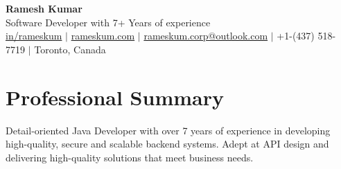 \documentclass[a4paper, 10pt]{article}
\begin{document}
\begin{center}
  \textbf{\huge Ramesh Kumar} \\
  \vspace{2pt}
  Software Developer with 7+ Years of experience\\
  \vspace{2pt}
  \href{https:\\linkedin.com/in/rameskum}{\small \faLinkedin \hspace{2pt} in/rameskum}
  $\vert$
  \href{https:\\rameskum.com}{\small \faChain \hspace{1pt} rameskum.com}
  $\vert$
  \href{mailto:rameskum.corp@outlook.com}{\small \faEnvelope \hspace{2pt} rameskum.corp@outlook.com}
  $\vert$
  \faPhone \hspace{1pt} \small{ +1-(437) 518-7719}
  $\vert$
  \small \faMapMarker \hspace{2pt} \small{Toronto, Canada}\\
\end{center}

\small
\section{Professional Summary}



Detail-oriented Java Developer with over 7 years of experience in developing high-quality, secure and scalable backend systems. Adept at API design and delivering high-quality solutions that meet business needs.
\end{document}
